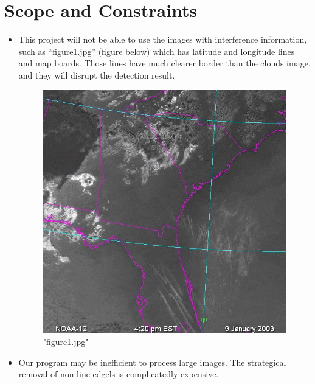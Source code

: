 \newpage
\section{Scope and Constraints}
\begin{itemize}
    \item This project will not be able to use the images with interference information, such as “figure1.jpg” (figure below) which has latitude and longitude lines and map boards. Those lines have much clearer border than the clouds image, and they will disrupt the detection result.
    \begin{figure}[htb]
        \centering
        \includegraphics[scale=0.5]{pic/figure1.jpg}
        \caption[Short form for the mapping directory]{"figure1.jpg"}
    \end{figure}
    \item Our program may be inefficient to process large images. The strategical removal of non-line edgels is complicatedly expensive.
\end{itemize}